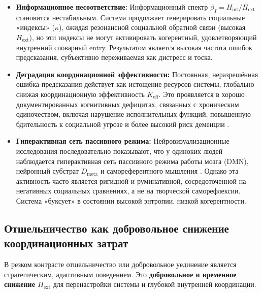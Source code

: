 \documentclass[12pt,a4paper]{article}
\begin{document}
	\begin{itemize}
		\item \textbf{Информационное несоответствие:} Информационный спектр \(\beta_I = H_{\mathrm{int}}/H_{\mathrm{ext}}\) становится нестабильным. Система продолжает генерировать социальные «индексы» (\(\kappa\)), ожидая резонансной социальной обратной связи (высокая \(H_{\mathrm{ext}}\)), но эти индексы не могут активировать когерентный, удовлетворяющий внутренний словарный entry. Результатом является высокая частота ошибок предсказания, субъективно переживаемая как дистресс и тоска.
		\item \textbf{Деградация координационной эффективности:} Постоянная, неразрешённая ошибка предсказания действует как истощение ресурсов системы, глобально снижая координационную эффективность \(K_{\mathrm{eff}}\). Это проявляется в хорошо документированных когнитивных дефицитах, связанных с хроническим одиночеством, включая нарушение исполнительных функций, повышенную бдительность к социальной угрозе и более высокий риск деменции \cite{Finley2025}.
		\item \textbf{Гиперактивная сеть пассивного режима:} Нейровизуализационные исследования последовательно показывают, что у одиноких людей наблюдается гиперактивная сеть пассивного режима работы мозга (DMN), нейронный субстрат \(D_{\text{meta}}\) и самореферентного мышления \cite{Spreng2020}. Однако эта активность часто является ригидной и руминативной, сосредоточенной на негативных социальных сравнениях, а не на творческой саморефлексии. Система «буксует» в состоянии высокой энтропии, низкой когерентности.
	\end{itemize}
	
	\subsection{Отшельничество как добровольное снижение координационных затрат}
	
	В резком контрасте отшельничество или добровольное уединение является стратегическим, адаптивным поведением. Это \textbf{добровольное и временное снижение \(H_{\mathrm{ext}}\)} для перенастройки системы и глубокой внутренней координации.
	
\end{document}
